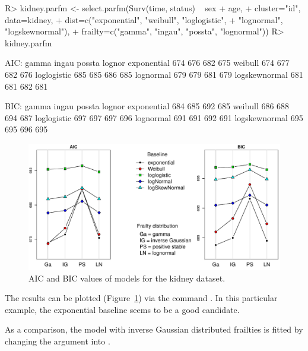 \begin{CodeChunk}
\begin{CodeInput}
R> kidney.parfm <- select.parfm(Surv(time, status) ~ sex + age, 
+    cluster="id", data=kidney,
+    dist=c("exponential", "weibull", "loglogistic",
+           "lognormal", "logskewnormal"),
+    frailty=c("gamma", "ingau", "possta", "lognormal"))
R> kidney.parfm
\end{CodeInput}
\begin{CodeOutput}
 AIC:             gamma  ingau possta lognor
   exponential      674    676    682    675
   weibull          674    677    682    676
   loglogistic      685    685    686    685
   lognormal        679    679    681    679
   logskewnormal    681    681    682    681

 BIC:             gamma  ingau possta lognor
   exponential      684    685    692    685
   weibull          686    688    694    687
   loglogistic      697    697    697    696
   lognormal        691    691    692    691
   logskewnormal    695    695    696    695
\end{CodeOutput}
\end{CodeChunk}

\begin{figure}
  \centering
  \includegraphics[width=.95\textwidth]{./graphs/plot.pdf}
  \caption{AIC and BIC values of  models for the {kidney} dataset.}
  \label{fig:kidney.parfm}
\end{figure}

The results can be plotted (Figure~\ref{fig:kidney.parfm}) via the command .
In this particular example, the exponential baseline seems to be a good candidate.

As a comparison, the model with inverse Gaussian distributed frailties
  is fitted by changing the  argument into .

